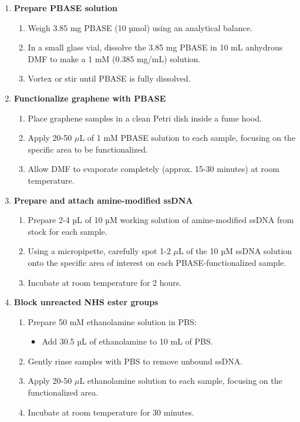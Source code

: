\documentclass[11pt]{article}
\begin{document}
\begin{enumerate}
    \item \textbf{Prepare PBASE solution}
    \begin{enumerate}[label=(\alph*)]
        \item Weigh 3.85 mg PBASE (10 µmol) using an analytical balance.
        \item In a small glass vial, dissolve the 3.85 mg PBASE in 10 mL anhydrous DMF to make a 1 mM (0.385 mg/mL) solution.
        \item Vortex or stir until PBASE is fully dissolved.
    \end{enumerate}

    \item \textbf{Functionalize graphene with PBASE}
    \begin{enumerate}[label=(\alph*)]
        \item Place graphene samples in a clean Petri dish inside a fume hood.
        \item Apply 20-50 $\mu$L of 1 mM PBASE solution to each sample, focusing on the specific area to be functionalized.
        \item Allow DMF to evaporate completely (approx. 15-30 minutes) at room temperature.
    \end{enumerate}

    \item \textbf{Prepare and attach amine-modified ssDNA}
    \begin{enumerate}[label=(\alph*)]
        \item Prepare 2-4 µL of 10 µM working solution of amine-modified ssDNA from stock for each sample.
        \item Using a micropipette, carefully spot 1-2 $\mu$L of the 10 µM ssDNA solution onto the specific area of interest on each PBASE-functionalized sample.
        \item Incubate at room temperature for 2 hours.
    \end{enumerate}

    \item \textbf{Block unreacted NHS ester groups}
    \begin{enumerate}[label=(\alph*)]
        \item Prepare 50 mM ethanolamine solution in PBS:
        \begin{itemize}
            \item Add 30.5 µL of ethanolamine to 10 mL of PBS.
        \end{itemize}
        \item Gently rinse samples with PBS to remove unbound ssDNA.
        \item Apply 20-50 $\mu$L ethanolamine solution to each sample, focusing on the functionalized area.
        \item Incubate at room temperature for 30 minutes.
    \end{enumerate}


\end{enumerate}
\end{document}

